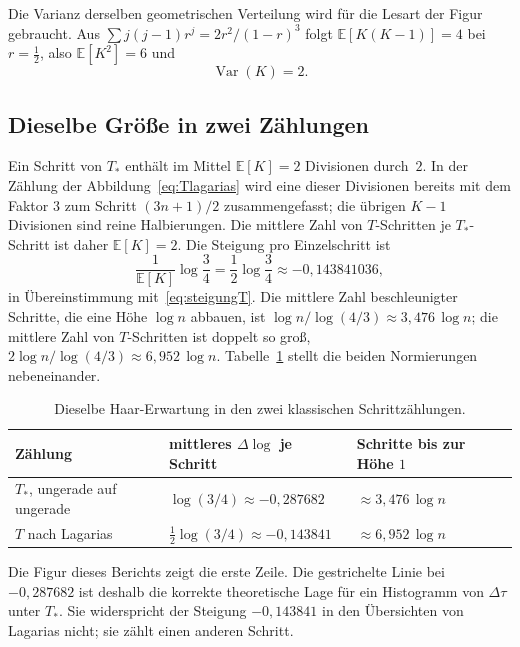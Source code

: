\documentclass[11pt,a4paper]{article}
\theoremstyle{plain}
\theoremstyle{definition}
\newcommand{\E}{\mathbb{E}}
\numberwithin{equation}{section}
\begin{document}
Die Varianz derselben geometrischen Verteilung wird für die Lesart der
Figur gebraucht.
Aus $\sum j(j-1)r^j=2r^2/(1-r)^3$ folgt $\E[K(K-1)]=4$ bei $r=\tfrac12$,
also $\E[K^2]=6$ und
\begin{equation}
\operatorname{Var}(K)=2.
\end{equation}

\subsection{Dieselbe Größe in zwei Zählungen}

Ein Schritt von $T_*$ enthält im Mittel $\E[K]=2$ Divisionen durch~$2$.
In der Zählung der Abbildung~\eqref{eq:Tlagarias} wird eine dieser
Divisionen bereits mit dem Faktor $3$ zum Schritt $(3n+1)/2$ zusammengefasst;
die übrigen $K-1$ Divisionen sind reine Halbierungen.
Die mittlere Zahl von $T$-Schritten je $T_*$-Schritt ist daher $\E[K]=2$.
Die Steigung pro Einzelschritt ist
\begin{equation}
\frac{1}{\E[K]}\log\frac34
=\frac12\log\frac34
\approx -0{,}143841036,
\end{equation}
in Übereinstimmung mit~\eqref{eq:steigungT}.
Die mittlere Zahl beschleunigter Schritte, die eine Höhe $\log n$ abbauen,
ist $\log n\big/\log(4/3)\approx 3{,}476\,\log n$;
die mittlere Zahl von $T$-Schritten ist doppelt so groß,
$2\log n\big/\log(4/3)\approx 6{,}952\,\log n$.
Tabelle~\ref{tab:drift} stellt die beiden Normierungen nebeneinander.

\begin{table}[ht]
\centering
\caption{Dieselbe Haar-Erwartung in den zwei klassischen Schrittzählungen.}
\label{tab:drift}
\begin{tabular}{@{}lll@{}}
\toprule
Zählung & mittleres $\Delta\log$ je Schritt & Schritte bis zur Höhe $1$\\
\midrule
$T_*$, ungerade auf ungerade & $\log(3/4)\approx -0{,}287682$ &
$\approx 3{,}476\,\log n$\\
$T$ nach Lagarias & $\tfrac12\log(3/4)\approx -0{,}143841$ &
$\approx 6{,}952\,\log n$\\
\bottomrule
\end{tabular}
\end{table}

Die Figur dieses Berichts zeigt die erste Zeile.
Die gestrichelte Linie bei $-0{,}287682$ ist deshalb die korrekte theoretische
Lage für ein Histogramm von $\Delta\tau$ unter $T_*$.
Sie widerspricht der Steigung $-0{,}143841$ in den Übersichten von Lagarias
nicht; sie zählt einen anderen Schritt.
\end{document}
